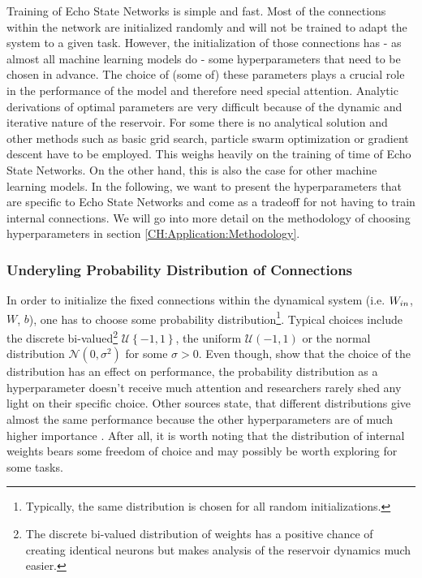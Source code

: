 Training of Echo State Networks is simple and fast. Most of the connections within the network are initialized randomly and will not be trained to adapt the system to a given task. However, the initialization of those connections has  - as almost all machine learning models do - some hyperparameters that need to be chosen in advance. The choice of (some of) these parameters plays a crucial role in the performance of the model and therefore need special attention. Analytic derivations of optimal parameters are very difficult because of the dynamic and iterative nature of the reservoir. For some there is no analytical solution and other methods such as basic grid search, particle swarm optimization \citep{basterrech2015experimental} or gradient descent \citep{JAEGER2007335} have to be employed. This weighs heavily on the training of time of Echo State Networks. On the other hand, this is also the case for other machine learning models. In the following, we want to present the hyperparameters that are specific to Echo State Networks and come as a tradeoff for not having to train internal connections. %
We will go into more detail on the methodology of choosing hyperparameters in section \ref{CH:Application:Methodology}.


\subsubsection{Underyling Probability Distribution of Connections}

In order to initialize the fixed connections within the dynamical system (i.e. $W_{in}$, $W$, $b$), one has to choose some probability distribution\footnote{Typically, the same distribution is chosen for all random initializations.}. Typical choices include the discrete bi-valued\footnote{The discrete bi-valued distribution of weights has a positive chance of creating identical neurons but makes analysis of the reservoir dynamics much easier.} $\mathcal{U}\left\{-1, 1\right\}$, the uniform $\mathcal{U}(-1, 1)$ or the normal distribution $\mathcal{N}(0, \sigma^2)$ for some $\sigma >0$. Even though, \cite{Wu2018StatChallenges} show that the choice of the distribution has an effect on performance, the probability distribution as a hyperparameter doesn't receive much attention and researchers rarely shed any light on their specific choice. Other sources state, that different distributions give almost the same performance because the other hyperparameters are of much higher importance \citep{Lukosecicius2012}. After all, it is worth noting that the distribution of internal weights bears some freedom of choice and may possibly be worth exploring for some tasks.

